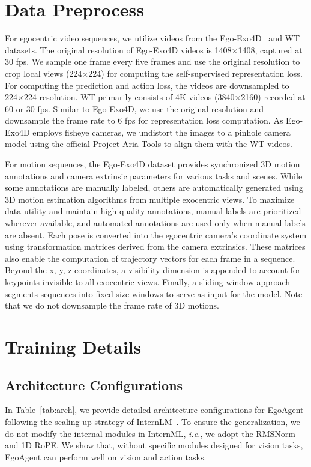 \section{Data Preprocess}
For egocentric video sequences, we utilize videos from the Ego-Exo4D~\cite{grauman2024ego} and WT~\cite{venkataramanan2023imagenet} datasets.
The original resolution of Ego-Exo4D videos is 1408×1408, captured at 30 fps. We sample one frame every five frames and use the original resolution to crop local views (224×224) for computing the self-supervised representation loss. For computing the prediction and action loss, the videos are downsampled to 224×224 resolution.
WT primarily consists of 4K videos (3840×2160) recorded at 60 or 30 fps. Similar to Ego-Exo4D, we use the original resolution and downsample the frame rate to 6 fps for representation loss computation.
As Ego-Exo4D employs fisheye cameras, we undistort the images to a pinhole camera model using the official Project Aria Tools to align them with the WT videos.

For motion sequences, the Ego-Exo4D dataset provides synchronized 3D motion annotations and camera extrinsic parameters for various tasks and scenes. While some annotations are manually labeled, others are automatically generated using 3D motion estimation algorithms from multiple exocentric views. To maximize data utility and maintain high-quality annotations, manual labels are prioritized wherever available, and automated annotations are used only when manual labels are absent.
Each pose is converted into the egocentric camera's coordinate system using transformation matrices derived from the camera extrinsics. These matrices also enable the computation of trajectory vectors for each frame in a sequence. Beyond the x, y, z coordinates, a visibility dimension is appended to account for keypoints invisible to all exocentric views. Finally, a sliding window approach segments sequences into fixed-size windows to serve as input for the model. Note that we do not downsample the frame rate of 3D motions.

\section{Training Details}
\subsection{Architecture Configurations}
In Table~\ref{tab:arch}, we provide detailed architecture configurations for EgoAgent following the scaling-up strategy of InternLM~\cite{team2023internlm}. To ensure the generalization, we do not modify the internal modules in InternML, \emph{i.e.}, we adopt the RMSNorm and 1D RoPE. We show that, without specific modules designed for vision tasks, EgoAgent can perform well on vision and action tasks.

